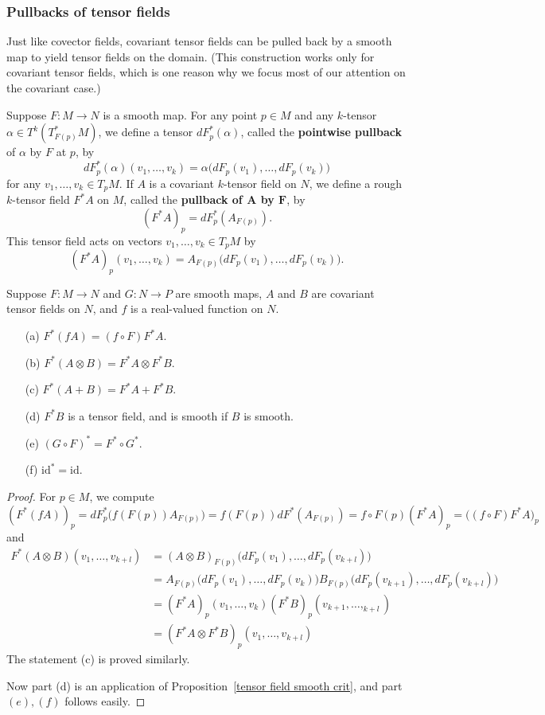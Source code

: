 \subsubsection{Pullbacks of tensor fields}
Just like covector fields, covariant tensor fields can be pulled back by a smooth map to yield tensor fields on the domain. (This construction works only for covariant tensor fields, which is one reason why we focus most of our attention on the covariant case.)\par
Suppose $F:M\to N$ is a smooth map. For any point $p\in M$ and any $k$-tensor $\alpha\in T^k(T^*_{F(p)}M)$, we define a tensor $dF^*_p(\alpha)$, called the \textbf{pointwise pullback} of $\alpha$ by $F$ at $p$, by
\[dF_p^*(\alpha)(v_1,\dots,v_k)=\alpha\big(dF_p(v_1),\dots,dF_p(v_k)\big)\]
for any $v_1,\dots,v_k\in T_pM$. If $A$ is a covariant $k$-tensor field on $N$, we define a rough $k$-tensor field $F^*A$ on $M$, called the \textbf{pullback of $\bm{A}$ by $\bm{F}$}, by
\[(F^*A)_p=dF^*_p(A_{F(p)}).\]
This tensor field acts on vectors $v_1,\dots,v_k\in T_pM$ by
\[(F^*A)_p(v_1,\dots,v_k)=A_{F(p)}\big(dF_p(v_1),\dots,dF_p(v_k)\big).\]
\begin{proposition}\label{tensor pull back prop}
Suppose $F:M\to N$ and $G:N\to P$ are smooth maps, $A$ and $B$ are covariant tensor fields on $N$, and $f$ is a real-valued function on $N$.
\begin{itemize}
\item[(a)] $F^*(fA)=(f\circ F)F^*A$.
\item[(b)] $F^*(A\otimes B)=F^*A\otimes F^*B$.
\item[(c)] $F^*(A+B)=F^*A+F^*B$.
\item[(d)] $F^*B$ is a tensor field, and is smooth if $B$ is smooth.
\item[(e)] $(G\circ F)^*=F^*\circ G^*$.
\item[(f)] $\mathrm{id}^*=\mathrm{id}$.
\end{itemize}
\end{proposition}
\begin{proof}
For $p\in M$, we compute
\[(F^*(fA))_p=dF^*_p\big(f(F(p))A_{F(p)}\big)=f(F(p))dF^*(A_{F(p)})=f\circ F(p)(F^*A)_p=\big((f\circ F)F^*A\big)_p\]
and
\begin{align*}
F^*(A\otimes B)(v_1,\dots,v_{k+l})&=(A\otimes B)_{F(p)}\big(dF_p(v_1),\dots,dF_p(v_{k+l})\big)\\
&=A_{F(p)}\big(dF_p(v_1),\dots,dF_p(v_{k})\big)B_{F(p)}\big(dF_p(v_{k+1}),\dots,dF_p(v_{k+l})\big)\\
&=(F^*A)_p(v_1,\dots,v_k)(F^*B)_p(v_{k+1},\dots,_{k+l})\\
&=(F^*A\otimes F^*B)_p(v_1,\dots,v_{k+l})
\end{align*}
The statement (c) is proved similarly.\par
Now part (d) is an application of Proposition~\ref{tensor field smooth crit}, and part $(e),(f)$ follows easily.
\end{proof}
